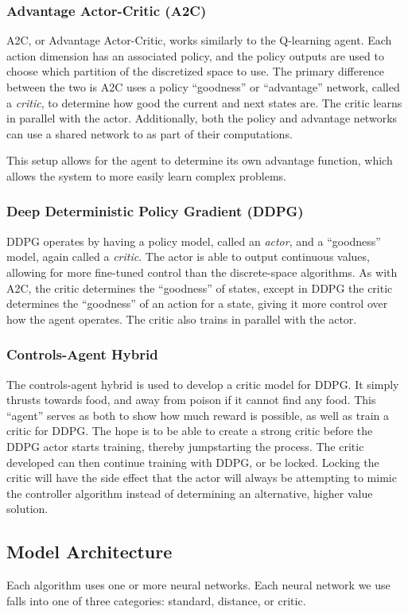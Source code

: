 \subsubsection{Advantage Actor-Critic (A2C)}
A2C, or Advantage Actor-Critic, works similarly to the Q-learning agent.
Each action dimension has an associated policy, and the policy outputs are used to
choose which partition of the discretized space to use.
The primary difference between the two is A2C uses a policy ``goodness'' or
``advantage'' network, called a \textit{critic}, to determine how good the current
and next states are.
The critic learns in parallel with the actor.
Additionally, both the policy and advantage networks can use a shared network to as
part of their computations.

This setup allows for the agent to determine its own advantage function, which
allows the system to more easily learn complex problems.

\subsubsection{Deep Deterministic Policy Gradient (DDPG)}
DDPG operates by having a policy model, called an \textit{actor}, and a ``goodness''
model, again called a \textit{critic}.
The actor is able to output continuous values, allowing for more fine-tuned control
than the discrete-space algorithms.
As with A2C, the critic determines the ``goodness'' of states, except in DDPG the
critic determines the ``goodness'' of an action for a state, giving it more control
over how the agent operates.
The critic also trains in parallel with the actor.

\subsubsection{Controls-Agent Hybrid}
The controls-agent hybrid is used to develop a critic model for DDPG\@.
It simply thrusts towards food, and away from poison if it cannot find any food.
This ``agent'' serves as both to show how much reward is possible, as well as train a
critic for DDPG\@.
The hope is to be able to create a strong critic before the DDPG actor starts
training, thereby jumpstarting the process.
The critic developed can then continue training with DDPG, or be locked.
Locking the critic will have the side effect that the actor will always be attempting
to mimic the controller algorithm instead of determining an alternative, higher value
solution.

\subsection{Model Architecture}\label{subsec:model-architecture}
Each algorithm uses one or more neural networks.
Each neural network we use falls into one of three categories: standard, distance, or
critic.

